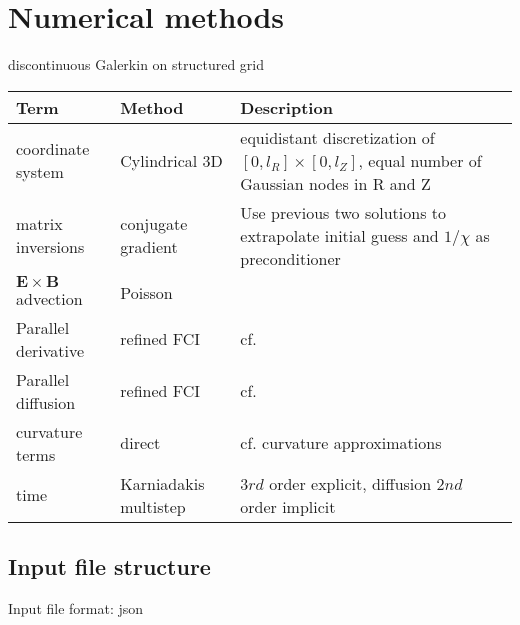 \documentclass{hitec} %
\newcommand{\ExB}{$\bm{E}\times\bm{B} \,$}
\begin{document}
\section{Numerical methods}
discontinuous Galerkin on structured grid 
\begin{longtable}{ll>{\RaggedRight}p{7cm}}
\toprule
\rowcolor{gray!50}\textbf{Term} &  \textbf{Method} & \textbf{Description}  \\ \midrule
coordinate system & Cylindrical 3D & equidistant discretization of $[0,l_R] \times [0,l_Z]$, equal number of Gaussian nodes in R and Z \\
matrix inversions & conjugate gradient & Use previous two solutions to extrapolate initial guess and $1/\chi$ as preconditioner \\
\ExB advection & Poisson & \\
Parallel derivative & refined  FCI & cf.~\cite{held16,stegmeir17} \\
Parallel diffusion & refined FCI & cf.~\cite{held16,stegmeir17} \\
curvature terms & direct & cf. curvature approximations \\
time &  Karniadakis multistep & $3rd$ order explicit, diffusion $2nd$ order implicit \\
\bottomrule
\end{longtable}

\subsection{Input file structure}
Input file format: json
\end{document}
